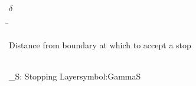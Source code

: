 \begin{tabbing}
\parbox{20mm}{$\delta$}\=\parbox{115mm}{Distance from boundary at which to accept a stop\dotfill \pageref{symbol:delta}}\\
\addsymbol \Gamma_S:        {Stopping Layer}{symbol:GammaS}
\end{tabbing}
